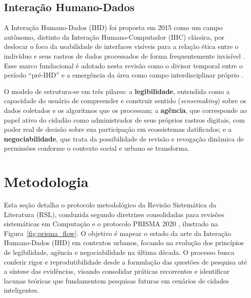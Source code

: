 \documentclass[12pt]{article}
\begin{document}
\subsection{Interação Humano-Dados}

A Interação Humano-Dados (IHD) foi proposta em 2015 como um campo autônomo, distinto da Interação Humano-Computador (IHC) clássica, por deslocar o foco da usabilidade de interfaces visíveis para a relação ética entre o indivíduo e seus rastros de dados processados de forma frequentemente invisível \cite{mortier2015humandatainteractionhumanface}. Esse marco fundacional é adotado nesta revisão como o divisor temporal entre o período ``pré-IHD'' \cite{Mashhadi2014} e a emergência da área como campo interdisciplinar próprio \cite{Sailaja2021Designing}.

O modelo de \cite{mortier2015humandatainteractionhumanface} estrutura-se em três pilares: a \textbf{legibilidade}, entendida como a capacidade do usuário de compreender e construir sentido (\textit{sensemaking}) sobre os dados coletados e os algoritmos que os processam; a \textbf{agência}, que corresponde ao papel ativo do cidadão como administrador de seus próprios rastros digitais, com poder real de decisão sobre sua participação em ecossistemas datificados; e a \textbf{negociabilidade}, que trata da possibilidade de revisão e revogação dinâmica de permissões conforme o contexto social e urbano se transforma.

\section{Metodologia} \label{sec:metodologia}

    Esta seção detalha o protocolo metodológico da Revisão Sistemática da Literatura (RSL), conduzida segundo diretrizes consolidadas para revisões sistemáticas em Computação \cite{KITCHENHAM2013} e o protocolo PRISMA 2020 \cite{prisma2021}, ilustrado na Figura~\ref{fig:prisma_flow}. O objetivo é mapear o estado da arte da Interação Humano-Dados (IHD) em contextos urbanos, focando na evolução dos princípios de legibilidade, agência e negociabilidade na última década. O processo busca conferir rigor e reprodutibilidade desde a formulação das questões de pesquisa até a síntese das evidências, visando consolidar práticas recorrentes e identificar lacunas teóricas que fundamentem pesquisas futuras em cenários de cidades inteligentes.
\end{document}
